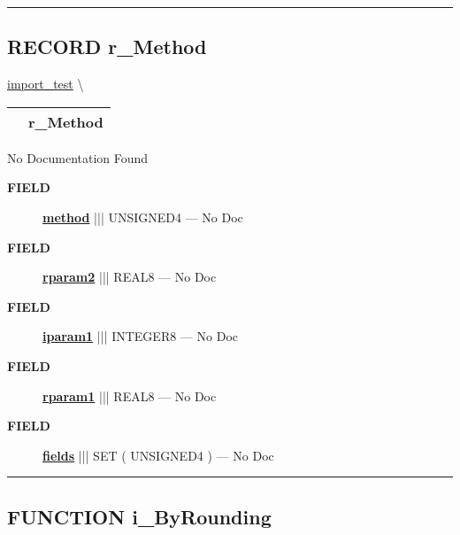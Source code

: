 \rule{\linewidth}{0.5pt}
\subsection*{\textsf{\colorbox{headtoc}{\color{white} RECORD}
r\_Method}}

\hypertarget{ecldoc:discretize.r_method}{}
\hspace{0pt} \hyperlink{ecldoc:Discretize}{import_test} \textbackslash 

{\renewcommand{\arraystretch}{1.5}
\begin{tabularx}{\textwidth}{|>{\raggedright\arraybackslash}l|X|}
\hline
\hspace{0pt}\mytexttt{\color{red} } & \textbf{r\_Method} \\
\hline
\end{tabularx}
}

\par





No Documentation Found







\par
\begin{description}
\item [\colorbox{tagtype}{\color{white} \textbf{\textsf{FIELD}}}] \textbf{\underline{method}} ||| UNSIGNED4 --- No Doc
\item [\colorbox{tagtype}{\color{white} \textbf{\textsf{FIELD}}}] \textbf{\underline{rparam2}} ||| REAL8 --- No Doc
\item [\colorbox{tagtype}{\color{white} \textbf{\textsf{FIELD}}}] \textbf{\underline{iparam1}} ||| INTEGER8 --- No Doc
\item [\colorbox{tagtype}{\color{white} \textbf{\textsf{FIELD}}}] \textbf{\underline{rparam1}} ||| REAL8 --- No Doc
\item [\colorbox{tagtype}{\color{white} \textbf{\textsf{FIELD}}}] \textbf{\underline{fields}} ||| SET ( UNSIGNED4 ) --- No Doc
\end{description}





\rule{\linewidth}{0.5pt}
\subsection*{\textsf{\colorbox{headtoc}{\color{white} FUNCTION}
i\_ByRounding}}

